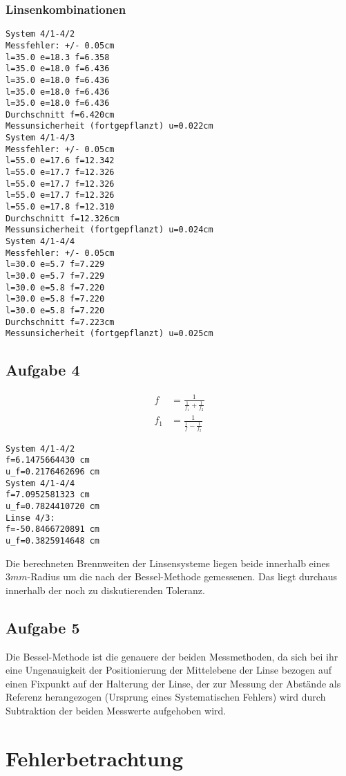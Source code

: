 \documentclass[12pt,a4paper,notitlepage]{article}
\begin{document}
\subsubsection{Linsenkombinationen}
\begin{verbatim}
System 4/1-4/2
Messfehler: +/- 0.05cm
l=35.0 e=18.3 f=6.358
l=35.0 e=18.0 f=6.436
l=35.0 e=18.0 f=6.436
l=35.0 e=18.0 f=6.436
l=35.0 e=18.0 f=6.436
Durchschnitt f=6.420cm
Messunsicherheit (fortgepflanzt) u=0.022cm
System 4/1-4/3
Messfehler: +/- 0.05cm
l=55.0 e=17.6 f=12.342
l=55.0 e=17.7 f=12.326
l=55.0 e=17.7 f=12.326
l=55.0 e=17.7 f=12.326
l=55.0 e=17.8 f=12.310
Durchschnitt f=12.326cm
Messunsicherheit (fortgepflanzt) u=0.024cm
System 4/1-4/4
Messfehler: +/- 0.05cm
l=30.0 e=5.7 f=7.229
l=30.0 e=5.7 f=7.229
l=30.0 e=5.8 f=7.220
l=30.0 e=5.8 f=7.220
l=30.0 e=5.8 f=7.220
Durchschnitt f=7.223cm
Messunsicherheit (fortgepflanzt) u=0.025cm
\end{verbatim}
\subsection{Aufgabe 4}
\begin{align}
f&=\frac{1}{\frac{1}{f_1}+\frac{1}{f_2}}\\
f_1&=\frac{1}{\frac{1}{f}-\frac{1}{f_2}}
\end{align}
\begin{verbatim}
System 4/1-4/2
f=6.1475664430 cm
u_f=0.2176462696 cm
System 4/1-4/4
f=7.0952581323 cm
u_f=0.7824410720 cm
Linse 4/3:
f=-50.8466720891 cm
u_f=0.3825914648 cm
\end{verbatim}
Die berechneten Brennweiten der Linsensysteme liegen beide innerhalb eines $3mm$-Radius um die nach der Bessel-Methode gemessenen. Das liegt durchaus innerhalb der noch zu diskutierenden Toleranz.
\subsection{Aufgabe 5}
Die Bessel-Methode ist die genauere der beiden Messmethoden, da sich bei ihr eine Ungenauigkeit  der Positionierung der Mittelebene der Linse bezogen auf einen Fixpunkt auf der Halterung der Linse, der zur Messung der Abstände als Referenz herangezogen (Ursprung eines Systematischen Fehlers) wird durch Subtraktion der beiden Messwerte aufgehoben wird.
\section{Fehlerbetrachtung}
\end{document}
